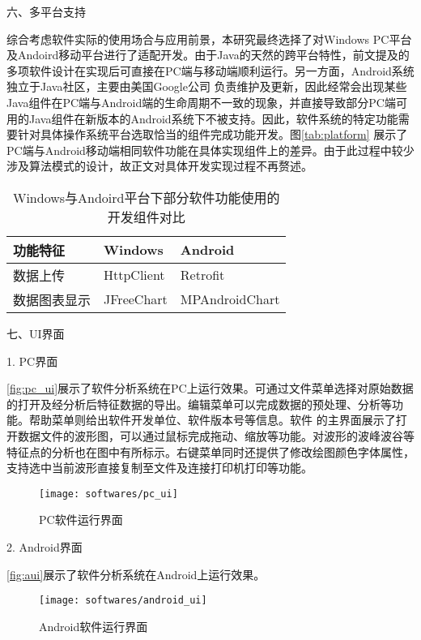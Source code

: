 六、多平台支持

综合考虑软件实际的使用场合与应用前景，本研究最终选择了对Windows PC平台及Andoird移动平台进行了适配开发。由于Java的天然的跨平台特性，前文提及的多项软件设计在实现后可直接在PC端与移动端顺利运行。另一方面，Android系统独立于Java社区，主要由美国Google公司
负责维护及更新，因此经常会出现某些Java组件在PC端与Android端的生命周期不一致的现象，并直接导致部分PC端可用的Java组件在新版本的Android系统下不被支持。因此，软件系统的特定功能需要针对具体操作系统平台选取恰当的组件完成功能开发。图\autoref{tab:platform}
展示了PC端与Android移动端相同软件功能在具体实现组件上的差异。由于此过程中较少涉及算法模式的设计，故正文对具体开发实现过程不再赘述。
\begin{table}[htbp]
    \centering
    \fontsize{10}{6}
    \caption{\label{tab:platform}Windows与Andoird平台下部分软件功能使用的开发组件对比}
    \begin{tabularx}{\linewidth}{X<{\centering}X<{\centering}X<{\centering}}
        \toprule \textbf{功能特征}&\textbf{Windows}&\textbf{Android}\\
        \midrule 
        数据上传&HttpClient\cite{HttpClient}&Retrofit\cite{Retrofit}\\
        数据图表显示&JFreeChart\cite{JFreeChart}&MPAndroidChart\cite{MPAndroidChart}\\
        \bottomrule
    \end{tabularx}
\end{table}

七、UI界面

1. PC界面

\autoref{fig:pc_ui}展示了软件分析系统在PC上运行效果。可通过文件菜单选择对原始数据的打开及经分析后特征数据的导出。编辑菜单可以完成数据的预处理、分析等功能。帮助菜单则给出软件开发单位、软件版本号等信息。软件
的主界面展示了打开数据文件的波形图，可以通过鼠标完成拖动、缩放等功能。对波形的波峰波谷等特征点的分析也在图中有所标示。右键菜单同时还提供了修改绘图颜色字体属性，支持选中当前波形直接复制至文件及连接打印机打印等功能。
\begin{figure}[htbp]
    \centering
    \texttt{[image: softwares/pc\_ui]}
    \caption{\label{fig:pc_ui}PC软件运行界面}
\end{figure}

2. Android界面

\autoref{fig:aui}展示了软件分析系统在Android上运行效果。
\begin{figure}[htbp]
    \centering
    \texttt{[image: softwares/android\_ui]}
    \caption{\label{fig:aui}Android软件运行界面}
\end{figure}


